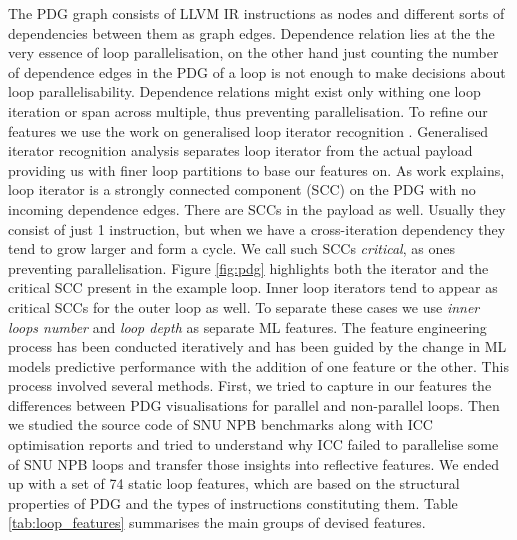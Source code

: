\documentclass[sigconf,10pt,review,anonymous]{acmart}
\begin{document}
\quad The PDG graph consists of LLVM IR instructions as nodes and different sorts of dependencies between them as graph edges. Dependence relation lies at the the very essence of loop parallelisation, on the other hand just counting the number of dependence edges in the PDG of a loop is not enough to make decisions about loop parallelisability. Dependence relations might exist only withing one loop iteration or span across multiple, thus preventing parallelisation.\newline\null
\quad To refine our features we use the work on generalised loop iterator recognition \cite{Manilov:2018:GPI:3178372.3179511}. Generalised iterator recognition analysis separates loop iterator from the actual payload providing us with finer loop partitions to base our features on. As work \cite{Manilov:2018:GPI:3178372.3179511} explains, loop iterator is a strongly connected component (SCC) on the PDG with no incoming dependence edges. There are SCCs in the payload as well. Usually they consist of just 1 instruction, but when we have a cross-iteration dependency they tend to grow larger and form a cycle. We call such SCCs \textit{critical}, as ones preventing parallelisation. Figure \ref{fig:pdg} highlights both the iterator and the critical SCC present in the example loop. Inner loop iterators tend to appear as critical SCCs for the outer loop as well. To separate these cases we use \textit{inner loops number} and \textit{loop depth} as separate ML features.\newline\null  
\quad The feature engineering process has been conducted iteratively and has been guided by the change in ML models predictive performance with the addition of one feature or the other. This process involved several methods. First, we tried to capture in our features the differences between PDG visualisations for parallel and non-parallel loops. Then we studied the source code of SNU NPB benchmarks along with ICC optimisation reports and tried to understand why ICC failed to parallelise some of SNU NPB loops and transfer those insights into reflective features.\newline\null
\quad We ended up with a set of 74 static loop features, which are based on the structural properties of PDG and the types of instructions constituting them. Table \ref{tab:loop_features} summarises the main groups of devised features.\newline\null
\end{document}
